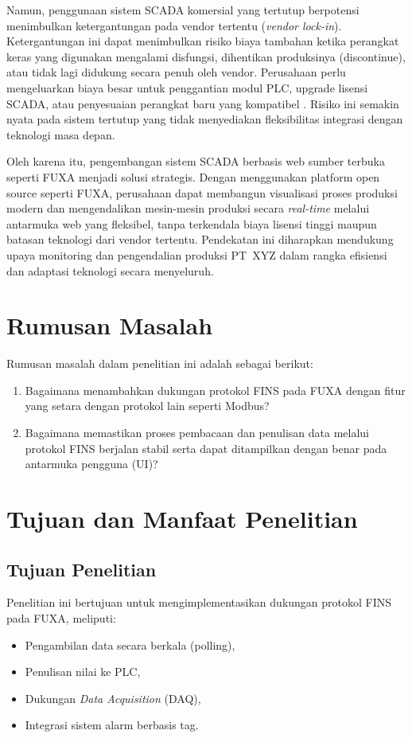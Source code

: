Namun, penggunaan sistem SCADA komersial yang tertutup berpotensi menimbulkan ketergantungan pada vendor tertentu (\textit{vendor lock-in}). Ketergantungan ini dapat menimbulkan risiko biaya tambahan ketika perangkat keras yang digunakan mengalami disfungsi, dihentikan produksinya (discontinue), atau tidak lagi didukung secara penuh oleh vendor. Perusahaan perlu mengeluarkan biaya besar untuk penggantian modul PLC, upgrade lisensi SCADA, atau penyesuaian perangkat baru yang kompatibel \parencite{banthia2024vendorlockin}. Risiko ini semakin nyata pada sistem tertutup yang tidak menyediakan fleksibilitas integrasi dengan teknologi masa depan.

Oleh karena itu, pengembangan sistem SCADA berbasis web sumber terbuka seperti FUXA menjadi solusi strategis. Dengan menggunakan platform open source seperti FUXA, perusahaan dapat membangun visualisasi proses produksi modern dan mengendalikan mesin-mesin produksi secara \textit{real-time} melalui antarmuka web yang fleksibel, tanpa terkendala biaya lisensi tinggi maupun batasan teknologi dari vendor tertentu. Pendekatan ini diharapkan mendukung upaya monitoring dan pengendalian produksi PT~XYZ dalam rangka efisiensi dan adaptasi teknologi secara menyeluruh.


\section{Rumusan Masalah}
Rumusan masalah dalam penelitian ini adalah sebagai berikut:
\begin{enumerate}
    \item Bagaimana menambahkan dukungan protokol FINS pada FUXA dengan fitur yang setara dengan protokol lain seperti Modbus?
    \item Bagaimana memastikan proses pembacaan dan penulisan data melalui protokol FINS berjalan stabil serta dapat ditampilkan dengan benar pada antarmuka pengguna (UI)?
\end{enumerate}

\section{Tujuan dan Manfaat Penelitian}
\subsection{Tujuan Penelitian}
Penelitian ini bertujuan untuk mengimplementasikan dukungan protokol FINS pada FUXA, meliputi:
\begin{itemize}
    \item Pengambilan data secara berkala (polling),
    \item Penulisan nilai ke PLC,
    \item Dukungan \textit{Data Acquisition} (DAQ),
    \item Integrasi sistem alarm berbasis tag.
\end{itemize}

